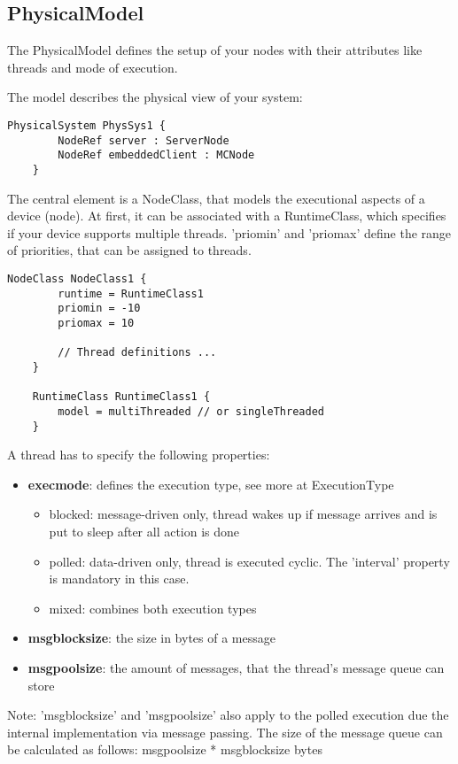 		
	
	\vspace{\baselineskip}
	\vspace{\baselineskip}
	\vspace{\baselineskip}
	
\subsection{PhysicalModel}
	\hypertarget{ref:PhysicalModel}{}
	The PhysicalModel defines the setup of your nodes with their attributes like threads and mode of execution.
		
	The model describes the physical view of your system:
	\begin{lstlisting}[language=etPhys]
	PhysicalSystem PhysSys1 {
		NodeRef server : ServerNode
		NodeRef embeddedClient : MCNode
	}
	\end{lstlisting}
	
	The central element is a NodeClass, that models the executional aspects of a device (node).
	At first, it can be associated with a RuntimeClass, which specifies if your device supports multiple threads.
	'priomin' and 'priomax' define the range of priorities, that can be assigned to threads.
	
	\begin{lstlisting}[language=etPhys]
	NodeClass NodeClass1 {
		runtime = RuntimeClass1
		priomin = -10
		priomax = 10
	
		// Thread definitions ...
	}
	
	RuntimeClass RuntimeClass1 {
		model = multiThreaded // or singleThreaded
	}
	\end{lstlisting}
	
	A thread has to specify the following properties:
	\begin{itemize}
		\item \textbf{execmode}: defines the execution type, see more at ExecutionType
		\begin{itemize}
			\item blocked: message-driven only, thread wakes up if message arrives and is put to sleep after all action is done
			\item polled: data-driven only, thread is executed cyclic. The 'interval' property is mandatory in this case.
			\item mixed: combines both execution types
		\end{itemize}
		\item \textbf{msgblocksize}: the size in bytes of a message
		\item \textbf{msgpoolsize}:  the amount of messages, that the thread's message queue can store
	\end{itemize}
	Note: 'msgblocksize' and 'msgpoolsize' also apply to the polled execution due the internal implementation via message passing. The size of the message queue can be calculated as follows: msgpoolsize * msgblocksize bytes 
	
